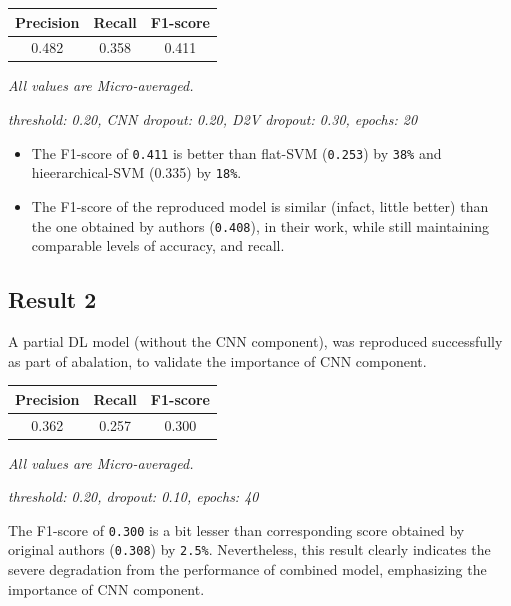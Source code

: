 \documentclass[11pt,a4paper]{article}
\begin{document}
\begin{small}
\begin{tabular}{ ccc }
  \hline
  	Precision & Recall & F1-score \\
  \hline
  	0.482 & 0.358 & 0.411 \\
  \hline
\end{tabular}

\textit{All values are Micro-averaged.}

\textit{threshold: 0.20, CNN dropout: 0.20, D2V dropout: 0.30, epochs: 20}
\end{small}
\newline

\begin{itemize}
	\item The F1-score of \texttt{0.411} is better than flat-SVM (\texttt{0.253}) by \texttt{38\%} and hieerarchical-SVM (0.335) by \texttt{18\%}.
	\item The F1-score of the reproduced model is similar (infact, little better) than the one obtained by authors (\texttt{0.408}), in their work, while still maintaining comparable levels of accuracy, and recall.
\end{itemize}

\subsection{Result 2}

A partial DL model (without the CNN component), was reproduced successfully as part of abalation, to validate the importance of CNN component.
\newline

\begin{small}
\begin{tabular}{ ccc }
  \hline
  	Precision & Recall & F1-score \\
  \hline
  	0.362 & 0.257 & 0.300 \\
  \hline
\end{tabular}

\textit{All values are Micro-averaged.}

\textit{threshold: 0.20, dropout: 0.10, epochs: 40}
\end{small}
\newline


The F1-score of \texttt{0.300} is a bit lesser than corresponding score obtained by original authors (\texttt{0.308}) by \texttt{2.5\%}. Nevertheless, this result clearly indicates the severe degradation from the performance of combined model, emphasizing the importance of CNN component.
\end{document}
